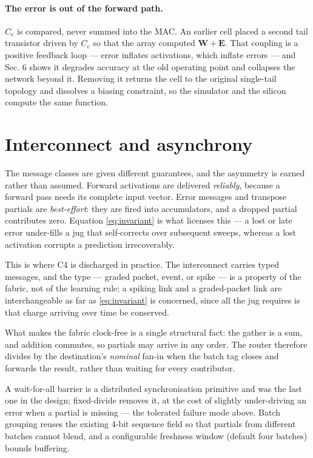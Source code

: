 \documentclass[11pt]{article}
\begin{document}
\hypertarget{the-error-is-out-of-the-forward-path.}{%
\paragraph{The error is out of the forward
path.}\label{the-error-is-out-of-the-forward-path.}}

\(C_e\) is compared, never summed into the MAC. An earlier cell placed a
second tail transistor driven by \(C_e\) so that the array computed
\(\bm W+ \bm E\). That coupling is a positive feedback loop --- error
inflates activations, which inflate errors --- and Sec. 6 shows it
degrades accuracy at the old operating point and collapses the network
beyond it. Removing it returns the cell to the original single-tail
topology and dissolves a biasing constraint, so the simulator and the
silicon compute the same function.

\hypertarget{sec:interconnect}{%
\section{Interconnect and asynchrony}\label{sec:interconnect}}

The message classes are given different guarantees, and the asymmetry is
earned rather than assumed. Forward activations are delivered
\emph{reliably}, because a forward pass needs its complete input vector.
Error messages and transpose partials are \emph{best-effort}: they are
fired into accumulators, and a dropped partial contributes zero.
Equation \eqref{eq:invariant} is what licenses this --- a lost or late error under-fills
a jug that self-corrects over subsequent sweeps, whereas a lost
activation corrupts a prediction irrecoverably.

This is where C4 is discharged in practice. The interconnect carries
typed messages, and the type --- graded packet, event, or spike --- is a
property of the fabric, not of the learning rule; a spiking link and a
graded-packet link are interchangeable as far as \eqref{eq:invariant} is concerned, since
all the jug requires is that charge arriving over time be conserved.

What makes the fabric clock-free is a single structural fact: the gather
is a sum, and addition commutes, so partials may arrive in any order.
The router therefore divides by the destination's \emph{nominal} fan-in
when the batch tag closes and forwards the result, rather than waiting
for every contributor.

A wait-for-all barrier is a distributed synchronisation primitive and
was the last one in the design; fixed-divide removes it, at the cost of
slightly under-driving an error when a partial is missing --- the
tolerated failure mode above. Batch grouping reuses the existing 4-bit
sequence field so that partials from different batches cannot blend, and
a configurable freshness window (default four batches) bounds buffering.
\end{document}
